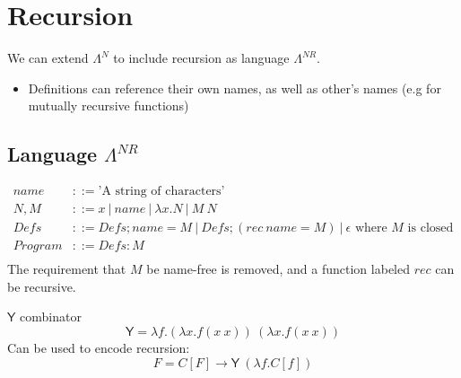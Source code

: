 \chapter{Recursion}
We can extend $\Lambda^N$ to include recursion as language $\Lambda^{NR}$.
\begin{itemize}
    \item Definitions can reference their own names, as well as other's names (e.g for mutually recursive functions)
\end{itemize}

\section{Language $\Lambda^{NR}$}
\[\begin{split}
    name & ::= \text{'A string of characters'} \\
    N, M & ::= x \ | \ name \ | \ \lambda x. N \ | \ M \ N \\
    Defs & ::= Defs ; name = M \ | \ Defs ; (rec \ name = M) \ | \ \epsilon \text{ where } M \text{ is closed}\\ 
    Program & ::= Defs : M \\
\end{split}\]
The requirement that $M$ be name-free is removed, and a function labeled $rec$ can be recursive.

\begin{definitionbox}{$\mathsf{Y}$ combinator}
    \[\mathsf{Y} = \lambda f . (\lambda x . f (x \ x)) \ (\lambda x . f (x \ x))\]
    Can be used to encode recursion:
    \[F = C [F] \to \mathsf{Y} \ (\lambda f . C [f]) \]
\end{definitionbox}

